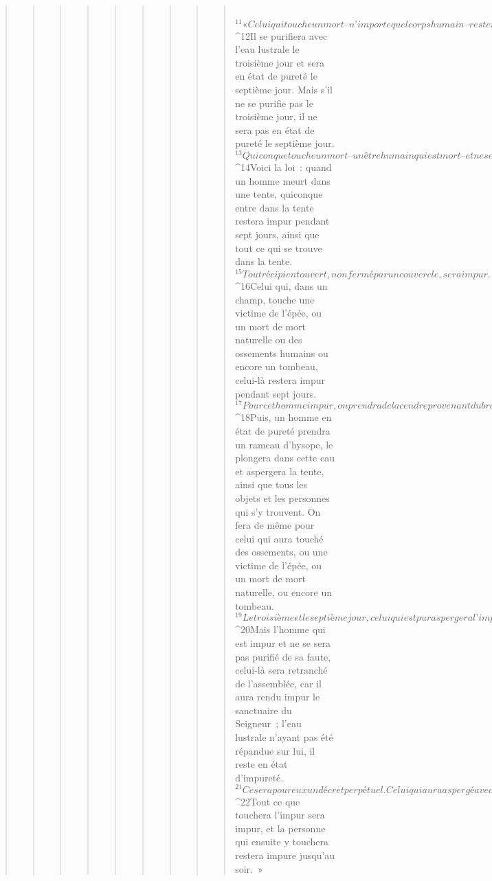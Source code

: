 \begin{verse}
\begin{verse}
\begin{verse}
\begin{verse}
\begin{verse}
\begin{verse}
\begin{verse}
\begin{verse}
\begin{verse}
         
${}^{11}« Celui qui touche un mort – n’importe quel corps humain – restera impur pendant sept jours. 
${}^{12}Il se purifiera avec l’eau lustrale le troisième jour et sera en état de pureté le septième jour. Mais s’il ne se purifie pas le troisième jour, il ne sera pas en état de pureté le septième jour. 
${}^{13}Quiconque touche un mort – un être humain qui est mort – et ne se purifie pas rend impure la demeure du Seigneur. Celui-là sera donc retranché d’Israël. Puisque l’eau lustrale n’a pas été répandue sur lui, il est impur, il reste en état d’impureté.
${}^{14}Voici la loi : quand un homme meurt dans une tente, quiconque entre dans la tente restera impur pendant sept jours, ainsi que tout ce qui se trouve dans la tente. 
${}^{15}Tout récipient ouvert, non fermé par un couvercle, sera impur.
${}^{16}Celui qui, dans un champ, touche une victime de l’épée, ou un mort de mort naturelle ou des ossements humains ou encore un tombeau, celui-là restera impur pendant sept jours. 
${}^{17}Pour cet homme impur, on prendra de la cendre provenant du brasier du sacrifice pour la faute et on la mettra dans un récipient en y ajoutant de l’eau vive. 
${}^{18}Puis, un homme en état de pureté prendra un rameau d’hysope, le plongera dans cette eau et aspergera la tente, ainsi que tous les objets et les personnes qui s’y trouvent. On fera de même pour celui qui aura touché des ossements, ou une victime de l’épée, ou un mort de mort naturelle, ou encore un tombeau. 
${}^{19}Le troisième et le septième jour, celui qui est pur aspergera l’impur ; et lorsqu’il l’aura purifié le septième jour, il lavera ses vêtements, se baignera dans l’eau et, le soir, il sera pur. 
${}^{20}Mais l’homme qui est impur et ne se sera pas purifié de sa faute, celui-là sera retranché de l’assemblée, car il aura rendu impur le sanctuaire du Seigneur ; l’eau lustrale n’ayant pas été répandue sur lui, il reste en état d’impureté.
${}^{21}Ce sera pour eux un décret perpétuel. Celui qui aura aspergé avec l’eau lustrale lavera ses vêtements ; celui qui aura touché l’eau lustrale restera impur jusqu’au soir. 
${}^{22}Tout ce que touchera l’impur sera impur, et la personne qui ensuite y touchera restera impure jusqu’au soir. »
      

\end{verse}
\end{verse}
\end{verse}
\end{verse}
\end{verse}
\end{verse}
\end{verse}
\end{verse}
\end{verse}
